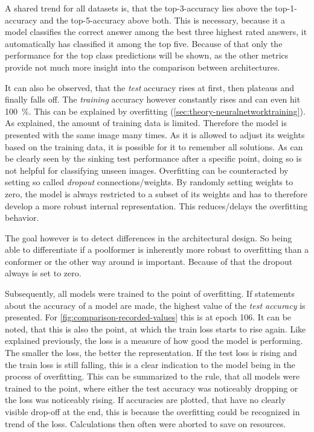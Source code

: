 A shared trend for all datasets is, that the top-3-accuracy lies above the top-1-accuracy and the top-5-accuracy above both. 
This is necessary, because it a model classifies the correct answer among the best three highest rated answers, it automatically has classified it among the top five. 
Because of that only the performance for the top class predictions will be shown, as the other metrics provide not much more insight into the comparison between architectures.

It can also be observed, that the \emph{test} accuracy rises at first, then plateaus and finally falls off.
The \emph{training} accuracy however constantly rises and can even hit \SI[]{100}[]{\percent}.
This can be explained by overfitting (\autoref{sec:theory-neuralnetworktraining}).
As explained, the amount of training data is limited. 
Therefore the model is presented with the same image many times. 
As it is allowed to adjust its weights based on the training data, it is possible for it to \glqq remember\grqq{} all solutions.
As can be clearly seen by the sinking test performance after a specific point, doing so is not helpful for classifying unseen images.
Overfitting can be counteracted by setting so called \emph{dropout} connections/weights.
By randomly setting weights to zero, the model is always restricted to a subset of its weights and has to therefore develop a more robust internal representation. This reduces/delays the overfitting behavior.

The goal however is to detect differences in the architectural design. 
So being able to differentiate if a poolformer is inherently more robust to overfitting than a conformer or the other way around is important. Because of that the dropout always is set to zero.

Subsequently, all models were trained to the point of overfitting. 
If statements about the accuracy of a model are made, the highest value of the \emph{test accuracy} is presented.
For \autoref{fig:comparison-recorded-values} this is at epoch 106.
It can be noted, that this is also the point, at which the train loss starts to rise again.
Like explained previously, the loss is a measure of how good the model is performing. 
The smaller the loss, the better the representation. 
If the test loss is rising and the train loss is still falling, this is a clear indication to the model being in the process of overfitting. 
This can be summarized to the rule, that all models were trained to the point, where either the test accuracy was noticeably dropping or the loss was noticeably rising.
If accuracies are plotted, that have no clearly visible drop-off at the end, this is because the overfitting could be recognized in trend of the loss. 
Calculations then often were aborted to save on resources.

